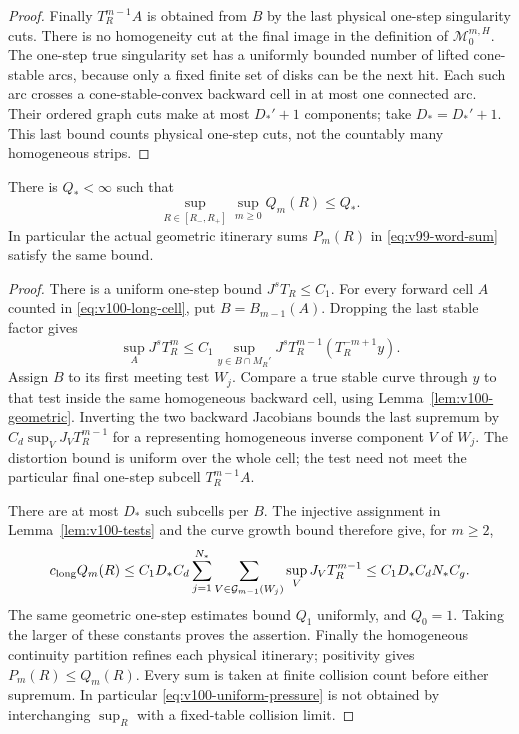 \begin{proof}
Finally $T_R^{m-1}A$ is obtained from $B$ by the last physical
one-step singularity cuts. There is no homogeneity cut at the final
image in the definition of $\mathcal M_0^{m,H}$. The one-step true
singularity set has a uniformly bounded number of lifted cone-stable
arcs, because only a fixed finite set of disks can be the next hit.
Each such arc crosses a cone-stable-convex backward cell in at most
one connected arc. Their ordered graph cuts make at most $D_*' +1$
components; take $D_*=D_*'+1$. This last bound counts physical
one-step cuts, not the countably many homogeneous strips.
\end{proof}

\begin{theorem}
\label{thm:v100-uniform-pressure}
There is $Q_*<\infty$ such that
\begin{equation}\label{eq:v100-uniform-pressure}
             \sup_{R\in[R_-,R_+]}\sup_{m\ge0}Q_m(R)\le Q_*.
\end{equation}
In particular the actual geometric itinerary sums $P_m(R)$ in
\eqref{eq:v99-word-sum} satisfy the same bound.
\end{theorem}
\begin{proof}
There is a uniform one-step bound $J^sT_R\le C_1$. For every forward
cell $A$ counted in \eqref{eq:v100-long-cell}, put $B=B_{m-1}(A)$.
Dropping the last stable factor gives
\[
 \sup_AJ^sT_R^m\le
 C_1\sup_{y\in B\cap M_R'}
          J^sT_R^{m-1}(T_R^{-m+1}y).
\]
Assign $B$ to its first meeting test $W_j$. Compare a true stable
curve through $y$ to that test inside the same homogeneous backward
cell, using Lemma~\ref{lem:v100-geometric}. Inverting the two
backward Jacobians bounds the last supremum by
$C_d\sup_V J_VT_R^{m-1}$ for a representing homogeneous inverse
component $V$ of $W_j$. The distortion bound is uniform over the
whole cell; the test need not meet the particular final one-step
subcell $T_R^{m-1}A$.

There are at most $D_*$ such subcells per $B$. The injective
assignment in Lemma~\ref{lem:v100-tests} and the curve growth bound
therefore give, for $m\ge2$,
\[
 c_{\rm long}Q_m(R)
 \le C_1D_*C_d\sum_{j=1}^{N_*}
       \sum_{V\in\mathcal G_{m-1}(W_j)}\sup_VJ_VT_R^{m-1}
 \le C_1D_*C_dN_*C_g.
\]
The same geometric one-step estimates bound $Q_1$ uniformly, and
$Q_0=1$. Taking the larger of these constants proves the assertion.
Finally the homogeneous continuity partition refines each physical
itinerary; positivity gives $P_m(R)\le Q_m(R)$. Every sum is taken
at finite collision count before either supremum. In particular
\eqref{eq:v100-uniform-pressure} is not obtained by interchanging
$\sup_R$ with a fixed-table collision limit.
\end{proof}
